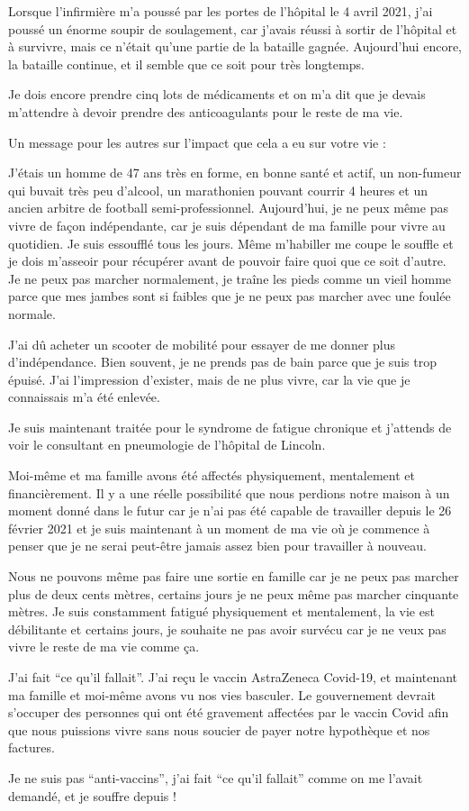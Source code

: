 Lorsque l'infirmière m'a poussé par les portes de l'hôpital le 4 avril 2021,
j'ai poussé un énorme soupir de soulagement, car j'avais réussi à sortir de
l'hôpital et à survivre, mais ce n'était qu'une partie de la bataille
gagnée. Aujourd'hui encore, la bataille continue, et il semble que ce soit pour
très longtemps.

Je dois encore prendre cinq lots de médicaments et on m'a dit que je devais
m'attendre à devoir prendre des anticoagulants pour le reste de ma vie.

Un message pour les autres sur l'impact que cela a eu sur votre vie :

J'étais un homme de 47 ans très en forme, en bonne santé et actif, un non-fumeur
qui buvait très peu d'alcool, un marathonien pouvant courrir 4 heures et un
ancien arbitre de football semi-professionnel. Aujourd'hui, je ne peux même pas
vivre de façon indépendante, car je suis dépendant de ma famille pour vivre au
quotidien. Je suis essoufflé tous les jours. Même m'habiller me coupe le souffle
et je dois m'asseoir pour récupérer avant de pouvoir faire quoi que ce soit
d'autre. Je ne peux pas marcher normalement, je traîne les pieds comme un vieil
homme parce que mes jambes sont si faibles que je ne peux pas marcher avec une
foulée normale.

J'ai dû acheter un scooter de mobilité pour essayer de me donner plus
d'indépendance. Bien souvent, je ne prends pas de bain parce que je suis trop
épuisé. J'ai l'impression d'exister, mais de ne plus vivre, car la vie que je
connaissais m'a été enlevée.

Je suis maintenant traitée pour le syndrome de fatigue chronique et j'attends de
voir le consultant en pneumologie de l'hôpital de Lincoln.

Moi-même et ma famille avons été affectés physiquement, mentalement et
financièrement. Il y a une réelle possibilité que nous perdions notre maison à
un moment donné dans le futur car je n'ai pas été capable de travailler depuis
le 26 février 2021 et je suis maintenant à un moment de ma vie où je commence à
penser que je ne serai peut-être jamais assez bien pour travailler à nouveau.

Nous ne pouvons même pas faire une sortie en famille car je ne peux pas marcher
plus de deux cents mètres, certains jours je ne peux même pas marcher cinquante
mètres. Je suis constamment fatigué physiquement et mentalement, la vie est
débilitante et certains jours, je souhaite ne pas avoir survécu car je ne veux
pas vivre le reste de ma vie comme ça.

J'ai fait “ce qu'il fallait”. J'ai reçu le vaccin AstraZeneca Covid-19, et
maintenant ma famille et moi-même avons vu nos vies basculer. Le gouvernement
devrait s'occuper des personnes qui ont été gravement affectées par le vaccin
Covid afin que nous puissions vivre sans nous soucier de payer notre hypothèque
et nos factures.

Je ne suis pas “anti-vaccins”, j'ai fait “ce qu'il fallait” comme on me l'avait
demandé, et je souffre depuis !
